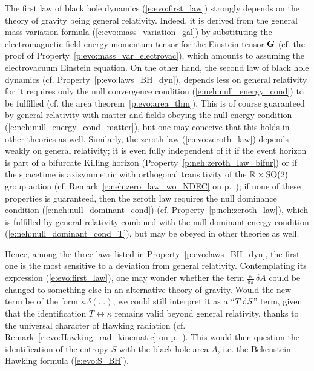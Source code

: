 The first law of black hole dynamics (\ref{e:evo:first_law}) strongly depends
on the theory of gravity being general relativity. Indeed, it is derived
from the general mass variation formula (\ref{e:evo:mass_variation_gal}) by
substituting the electromagnetic field energy-momentum tensor for
the Einstein tensor $\bm{G}$
(cf. the proof of Property~\ref{p:evo:mass_var_electrovac}), which amounts
to assuming the electrovacuum Einstein equation.
On the other hand, the second law of black hole dynamics (cf. Property~\ref{p:evo:laws_BH_dyn}),
depends less on general relativity for it requires only
the null convergence condition (\ref{e:neh:null_energy_cond}) to be fulfilled (cf. the area theorem~\ref{p:evo:area_thm}).
This is of course guaranteed by general relativity
with matter and fields obeying the null energy condition (\ref{e:neh:null_energy_cond_matter}), but one may conceive that this holds in other theories as well.
Similarly, the zeroth law (\ref{e:evo:zeroth_law}) depends weakly on general relativity; it is
even fully independent of it if the event horizon is
part of a bifurcate Killing horizon (Property~\ref{p:neh:zeroth_law_bifur}) or if
the spacetime is axisymmetric with orthogonal transitivity of the $\mathbb{R}\times\mathrm{SO}(2)$ group
action (cf. Remark~\ref{r:neh:zero_law_wo_NDEC} on p.~\pageref{r:neh:zero_law_wo_NDEC}); if none
of these properties is guaranteed, then the zeroth law requires the
null dominance condition (\ref{e:neh:null_dominant_cond}) (cf. Property~\ref{p:neh:zeroth_law}),
which is fulfilled by general relativity combined with the null dominant energy condition
(\ref{e:neh:null_dominant_cond_T}), but may be obeyed in other theories as well.

Hence, among the three laws listed in Property~\ref{p:evo:laws_BH_dyn},
the first one is the most sensitive to
a deviation from general relativity.
Contemplating its expression (\ref{e:evo:first_law}),
one may wonder whether the term
$\frac{\kappa}{8\pi} \, \delta A$
could be changed to something else in an alternative theory of gravity.
Would the new term be of the form $\kappa \, \delta(...)$,
we could still interpret it as a ``$T\, \mathrm{d} S$'' term, given that the identification
$T \leftrightarrow \kappa$ remains valid beyond general relativity, thanks to
the universal character of Hawking radiation (cf. Remark~\ref{r:evo:Hawking_rad_kinematic}
on p.~\pageref{r:evo:Hawking_rad_kinematic}). This would then question
the identification of the entropy $S$ with the black hole area $A$, i.e.
the Bekenstein-Hawking formula (\ref{e:evo:S_BH}).

